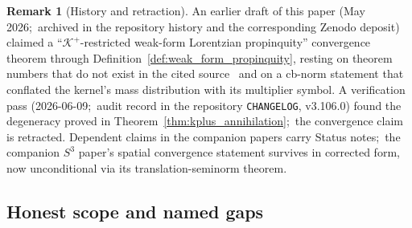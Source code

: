 \documentclass[11pt,a4paper]{article}
\theoremstyle{plain}
\theoremstyle{definition}
\newtheorem{remark}[theorem]{Remark}
\newcommand{\sthree}{S^{3}}
\newcommand{\Krein}{\mathcal{K}}
\newcommand{\Kplus}{\Krein^{+}}
\begin{document}
\begin{remark}[History and retraction]\label{rem:history}
An earlier draft of this paper (May 2026;\ archived in the repository
history and the corresponding Zenodo deposit) claimed a
``$\Kplus$-restricted weak-form Lorentzian propinquity'' convergence
theorem through Definition~\ref{def:weak_form_propinquity}, resting
on theorem numbers that do not exist in the cited
source~\cite{latremoliere_metric_st_2017} and on a cb-norm statement
that conflated the kernel's mass distribution with its multiplier
symbol. A verification pass (2026-06-09;\ audit record in the
repository \texttt{CHANGELOG}, v3.106.0) found the degeneracy proved
in Theorem~\ref{thm:kplus_annihilation};\ the convergence claim is
retracted. Dependent claims in the companion papers carry Status
notes;\ the companion $\sthree$ paper's spatial convergence statement
survives in corrected form, now unconditional via its
translation-seminorm theorem.
\end{remark}

\subsection{Honest scope and named gaps}\label{sec:scope_intro}
\end{document}
